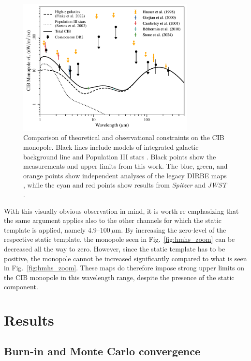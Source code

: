 \documentclass{aa}
\begin{document}
\begin{figure}
	\centering
	\includegraphics[width=0.8\textwidth]{figs/CIB_mono.pdf}
	\caption{
		Comparison of theoretical and observational constraints on the CIB monopole. Black lines include models of integrated galactic background line \citep{finke2022} and Population III stars \citep{santos:2002}. Black points show the measurements and upper limits from this work. The blue, green, and orange points show independent analyses of the legacy DIRBE maps \citep{hauser1998,gorjian:2000,cambresy:2001}, while the cyan and red points show results from \textit{Spitzer} \citep{bethermin:2010} and \textit{JWST} \citep{stone:2024}.
	}
	\label{fig:EBL_monopoles}
\end{figure}


With this visually obvious observation in mind, it is worth
re-emphasizing that the same argument applies also to the other
channels for which the static template is applied, namely
4.9--100$\,\mu\mathrm{m}$. By increasing the zero-level of the
respective static template, the monopole seen in
Fig.~\ref{fig:hmhs_zoom} can be decreased all the way to
zero. However, since the static template has to be positive, the monopole
cannot be increased significantly compared to what is seen in
Fig.~\ref{fig:hmhs_zoom}. These maps do therefore impose strong upper
limits on the CIB monopole in this wavelength range, despite the
presence of the static component.


\section{Results}
\label{sec:results}

\subsection{Burn-in and Monte Carlo convergence}
\end{document}
